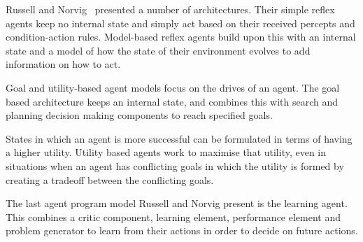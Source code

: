 \documentclass[]{final_report}
\begin{document}
Russell and Norvig~\cite{russell2016artificial} presented a number of architectures. Their simple reflex agents keep no internal state and simply act based on their received percepts and condition-action rules. Model-based reflex agents build upon this with an internal state and a model of how the state of their environment evolves to add information on how to act.\par 
Goal and utility-based agent models focus on the drives of an agent. The goal based architecture keeps an internal state, and combines this with search and planning decision making components to reach specified goals.\par
States in which an agent is more successful can be formulated in terms of having a higher utility. Utility based agents work to maximise that utility, even in situations when an agent has conflicting goals in which the utility is formed by creating a tradeoff between the conflicting goals.\par 
The last agent program model Russell and Norvig present is the learning agent. This combines a critic component, learning element, performance element and problem generator to learn from their actions in order to decide on future actions.
\end{document}
